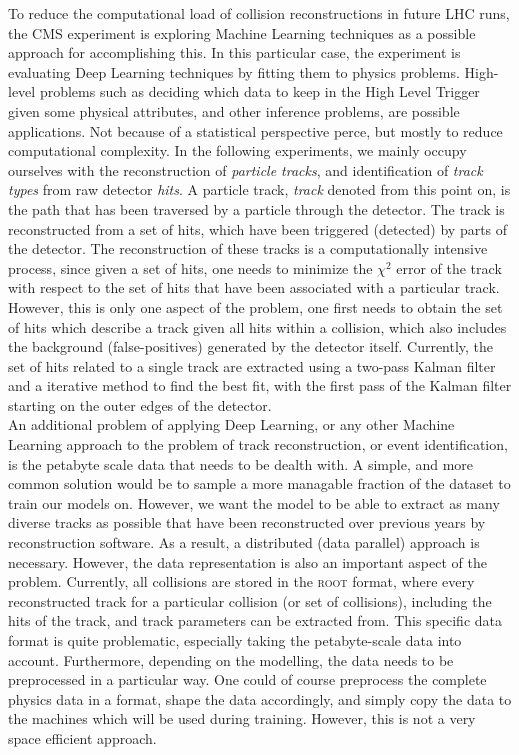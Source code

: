 To reduce the computational load of collision reconstructions in future LHC runs, the CMS experiment is exploring Machine Learning techniques as a possible approach for accomplishing this. In this particular case, the experiment is evaluating Deep Learning techniques by fitting them to physics problems. High-level problems such as deciding which data to keep in the High Level Trigger given some physical attributes, and other inference problems, are possible applications. Not because of a statistical perspective perce, but mostly to reduce computational complexity. In the following experiments, we mainly occupy ourselves with the reconstruction of \emph{particle tracks}, and identification of \emph{track types} from raw detector \emph{hits}. A particle track, \emph{track} denoted from this point on, is the path that has been traversed by a particle through the detector. The track is reconstructed from a set of hits, which have been triggered (detected) by parts of the detector. The reconstruction of these tracks is a computationally intensive process, since given a set of hits, one needs to minimize the $\chi^2$ error of the track with respect to the set of hits that have been associated with a particular track. However, this is only one aspect of the problem, one first needs to obtain the set of hits which describe a track given all hits within a collision, which also includes the background (false-positives) generated by the detector itself. Currently, the set of hits related to a single track are extracted using a two-pass Kalman filter and a iterative method to find the best fit, with the first pass of the Kalman filter starting on the outer edges of the detector.\\

An additional problem of applying Deep Learning, or any other Machine Learning approach to the problem of track reconstruction, or event identification, is the petabyte scale data that needs to be dealth with. A simple, and more common solution would be to sample a more managable fraction of the dataset to train our models on. However, we want the model to be able to extract as many diverse tracks as possible that have been reconstructed over previous years by reconstruction software. As a result, a distributed (data parallel) approach is necessary. However, the data representation is also an important aspect of the problem. Currently, all collisions are stored in the \textsc{root} format, where every reconstructed track for a particular collision (or set of collisions), including the hits of the track, and track parameters can be extracted from. This specific data format is quite problematic, especially taking the petabyte-scale data into account. Furthermore, depending on the modelling, the data needs to be preprocessed in a particular way. One could of course preprocess the complete physics data in a format, shape the data accordingly, and simply copy the data to the machines which will be used during training. However, this is not a very space efficient approach.\\

